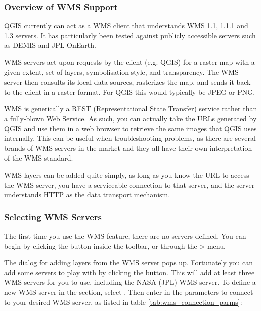 \subsubsection{Overview of WMS Support}\label{sec:ogc-wms-about}

QGIS currently can act as a WMS client that understands WMS 1.1, 1.1.1 and 1.3
servers.  It has particularly been tested against publicly accessible servers
such as DEMIS and JPL OnEarth.

WMS servers act upon requests by the client (e.g. QGIS) for a raster map with
a given extent, set of layers, symbolisation style, and transparency.  The WMS
server then consults its local data sources, rasterizes the map, and sends
it back to the client in a raster format.  For QGIS this would typically
be JPEG or PNG.

WMS is generically a REST (Representational State Transfer) service rather than
a fully-blown Web Service.  As such, you can actually take the URLs generated by
QGIS and use them in a web browser to retrieve the same images that QGIS uses
internally.  This can be useful when troubleshooting problems, as there are
several brands of WMS servers in the market and they all have their own
interpretation of the WMS standard.

WMS layers can be added quite simply, as long as you know the URL to access
the WMS server, you have a serviceable connection to that server, and the
server understands HTTP as the data transport mechanism.

\subsubsection{Selecting WMS Servers}\label{sec:ogc-wms-servers}

The first time you use the WMS feature, there are no servers defined. You 
can begin by clicking the  button inside the toolbar, 
or through the > menu.

The dialog for adding layers from the WMS server pops up. Fortunately you can 
add some servers to play with by clicking the  
button. This will add at least three WMS servers for you to use, including the NASA (JPL) 
WMS server. To define a new WMS server in the  section, 
select . Then enter in the parameters to connect to your desired
WMS server, as listed in table \ref{tab:wms_connection_parms}:

